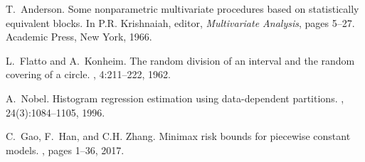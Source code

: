 \documentclass{article}
\newcommand{\1}{\mathbb{I}}
\theoremstyle{assumption}
\begin{document}
\begin{thebibliography}{10}
T.~Anderson.
\newblock Some nonparametric multivariate procedures based on statistically
  equivalent blocks.
\newblock In P.R. Krishnaiah, editor, {\em Multivariate Analysis}, pages 5--27.
  Academic Press, New York, 1966.

L.~Flatto and A.~Konheim.
\newblock The random division of an interval and the random covering of a
  circle.
, 4:211--222, 1962.

A.~Nobel.
\newblock Histogram regression estimation using data-dependent partitions.
, 24(3):1084--1105, 1996.

C.~Gao, F.~Han, and C.H. Zhang.
\newblock Minimax risk bounds for piecewise constant models.
, pages 1--36, 2017.

\end{thebibliography}
\end{document}
